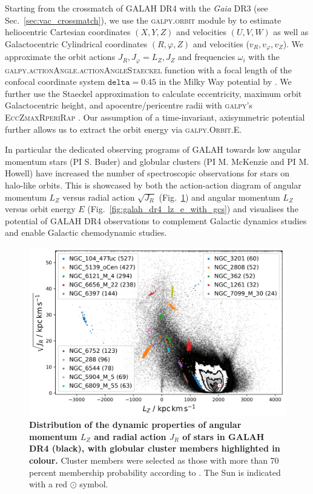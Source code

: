 \documentclass[
  journal=pasa,
  manuscript=research-paper, %
  year=2024,
  volume=37
]{cup-journal}
\newcommand{\Gaia}{\textit{Gaia}\xspace}
\begin{document}
Starting from the crossmatch of GALAH DR4 with the \Gaia DR3 (see Sec.~\ref{sec:vac_crossmatch}), we use the \textsc{galpy.orbit} module by \citet{Bovy2015} to estimate heliocentric Cartesian coordinates $(X,Y,Z)$ and velocities $(U,V,W)$ as well as Galactocentric Cylindrical coordinates $(R, \varphi, Z)$ and velocities ($v_R, v_\varphi, v_Z$). We approximate the orbit actions $J_R, J_\varphi = L_Z, J_Z$ and frequencies $\omega_i$ with the \textsc{galpy.actionAngle.actionAngleStaeckel} function with a focal length of the confocal coordinate system $\texttt{delta} = 0.45$ in the Milky Way potential by \citet{McMillan2017}. We further use the Staeckel approximation \citep{Binney2012} to calculate eccentricity, maximum orbit Galactocentric height, and apocentre/pericentre radii with \textsc{galpy}'s \textsc{EccZmaxRperiRap} \citep{Mackereth2018}. Our assumption of a time-invariant, axisymmetric potential further allows us to extract the orbit energy via \textsc{galpy.Orbit.E}.

In particular the dedicated observing programs of GALAH towards low angular momentum stars (PI S. Buder) and globular clusters (PI M. McKenzie and PI M. Howell) have increased the number of spectroscopic observations for stars on halo-like orbits. This is showcased by both the action-action diagram of angular momentum $L_Z$ versus radial action $\sqrt{J_R}$ (Fig.~\ref{fig:galah_dr4_lz_jr_with_gcs}) and angular momentum $L_Z$ versus orbit energy $E$ (Fig.~\ref{fig:galah_dr4_lz_e_with_gcs}) and visualises the potential of GALAH DR4 observations to complement Galactic dynamics studies and enable Galactic chemodynamic studies.

\begin{figure}[ht]
\includegraphics[width=\columnwidth]{figures/galah_dr4_lz_jr_with_gcs.png}
\caption{
\textbf{Distribution of the dynamic properties of angular momentum $L_Z$ and radial action $J_R$ of stars in GALAH DR4 (black), with globular cluster members highlighted in colour.} Cluster members were selected as those with more than 70 percent membership probability according to \citet{Vasiliev2021}. The Sun is indicated with a red $\odot$ symbol.
}
\label{fig:galah_dr4_lz_jr_with_gcs}
\end{figure}
\end{document}

